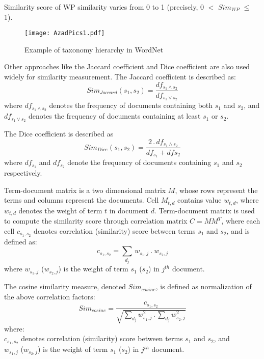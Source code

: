 Similarity score of WP similarity varies from 0 to 1 (precisely, 0 $<$ $Sim_{WP}$ $\leq$ 1).

\begin{figure}[h!]
	\centering 
	\texttt{[image: AzadPics1.pdf]}
	\caption{Example of taxonomy hierarchy in WordNet}
	\label{fig:Test2} 
\end{figure}

Other approaches like the Jaccard coefficient and Dice coefficient are also used widely for similarity measurement. The Jaccard coefficient \cite{jaccard1912distribution} is described as:
\begin{equation}
Sim_{Jaccard}(s_1, s_2) = \dfrac{df_{s_1\land s_2}}{df_{s_1\lor s_2}}
\end{equation}
where $df_{s_1\land s_2}$ denotes the frequency of documents containing both $s_1$ and $s_2$, and
\\$df_{s_1\lor s_2}$ denotes the frequency of documents containing at least $s_1$ or $s_2$. 

The Dice coefficient \cite{dice1945measures} is described as
\begin{equation}
Sim_{Dice}(s_1, s_2) = \dfrac{2\,.\,df_{s_1\land s_2}}{df_{s_1}+df{s_2}}
\end{equation}
where $df_{s_1}$ and $df_{s_2}$ denote the frequency of documents containing $s_1$ and $s_2$ respectively. 

Term-document matrix is a two dimensional matrix  $M$, whose rows represent the terms and columns represent the documents. Cell $M_{t,d}$ contains value $w_{t,d}$, where $w_{t,d}$ denotes the weight of term $t$ in document $d$. Term-document matrix  is used to compute the similarity score through correlation matrix $C=MM^{T}$, where each cell $c_{s_1, s_2}$ denotes correlation (similarity) score between terms $s_1$ and $s_2$, and is defined as:
\begin{equation}\label{eq:6}
c_{s_1, s_2} = \sum_{d_j}\, w_{s_1, j} \:.\: w_{s_2, j}
\end{equation}
where $w_{s_1, j}$ ($w_{s_2, j}$) is the weight of term $s_1$ ($s_2$) in $j^{th}$ document. 

The cosine similarity measure, denoted $Sim_{cosine}$, is defined as normalization of the above correlation factors:
\begin{equation}
Sim_{cosine}=\frac{c_{s_1,s_2}}{\sqrt{\sum\limits_{d_j}w^2_{s_1,j}\,.\,\sum\limits_{d_j}w^2_{s_2,j}}}
\end{equation}
where:\\ $c_{s_1, s_2}$ denotes correlation (similarity) score between terms $s_1$ and $s_2$, and\\ $w_{s_1, j}$ ($w_{s_2, j}$) is the weight of term $s_1$ ($s_2$) in $j^{th}$ document.

